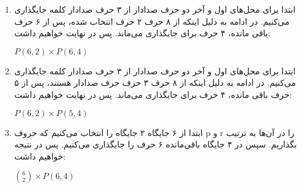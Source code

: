 \begin{enumerate}
  \item 
      ابتدا برای محل‌های اول و آخر دو حرف صدادار از ۳ حرف صدادار کلمه جایگذاری می‌کنیم. در ادامه به دلیل اینکه از ۸ حرف ۲ حرف انتخاب شده، پس از ۶ حرف باقی مانده، ۴ حرف برای جایگذاری می‌ماند. پس در نهایت خواهیم داشت:
      \begin{center}
        $P(6,2)\times P(6,4)$
      \end{center}

  \item 
      ابتدا برای محل‌های اول و آخر دو حرف صدادار از ۳ حرف صدادار کلمه جایگذاری می‌کنیم. در ادامه به دلیل اینکه از ۸ حرف ۳ حرف حرف صدادار هستند، پس از ۵ حرف باقی مانده، ۴ حرف برای جایگذاری می‌ماند. پس در نهایت خواهیم داشت:
      \begin{center}
        $P(6,2)\times P(5,4)$
      \end{center}

  \item 
      ابتدا از ۶ جایگاه ۲ جایگاه را انتخاب می‌کنیم که حروف p و r
      را در آن‌ها به ترتیب بگذاریم. سپس در ۴ جایگاه باقی‌مانده ۶ حرف را جایگذاری می‌کنیم. پس در نتیجه خواهیم داشت:
      \begin{center}
        ${6 \choose 2}\times P(6,4)$
      \end{center}
\end{enumerate}